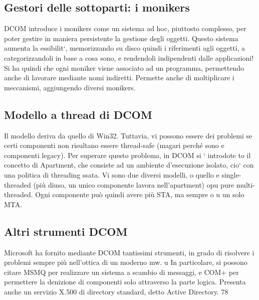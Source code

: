\documentclass[a4paper,12pt]{article}
\begin{document}
\subsection{Gestori delle sottoparti: i monikers}
DCOM introduce i monikers come un sistema ad hoc, piuttosto complesso, per
poter gestire in maniera persistente la gestione degli oggetti. Questo sistema
aumenta la essibilit`, memorizzando su disco quindi i riferimenti agli oggetti,
a
categorizzandoli in base a cosa sono, e rendendoli indipendenti dalle applicazioni!
Si ha quindi che ogni moniker viene associato ad un programma, permettendo
anche di lavorare mediante nomi indiretti. Permette anche di moltiplicare i
meccanismi, aggiungendo diversi monikers.
\subsection{Modello a thread di DCOM}
Il modello deriva da quello di Win32. Tuttavia, vi possono essere dei problemi se certi componenti non risultano essere
thread-safe (magari perché sono
e
componenti legacy). Per superare questo problema, in DCOM si ` introdote
to il concetto di Apartment, che consiste ad un ambiente d'esecuzione isolato,
cio` con una politica di threading ssata. Vi sono due diversi modelli, o quello
e
single-threaded (più diuso, un unico componente lavora nell'apartment) opu
pure multi-threaded. Ogni componente può quindi avere più STA, ma sempre
o
u
un solo MTA.
\subsection{Altri strumenti DCOM}
Microsoft ha fornito mediante DCOM tantissimi strumenti, in grado di risolvere
i problemi sempre più nell'ottica di un moderno mw.
u
In particolare, si possono citare MSMQ per realizzare un sistema a scambio di
messaggi, e COM+ per permettere la denizione di componenti solo attraverso
la parte logica. Presenta anche un servizio X.500 di directory standard, detto
Active Directory.
78
\end{document}

